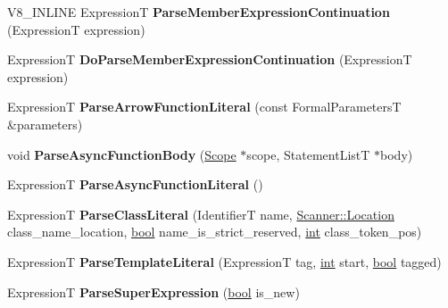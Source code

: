 \begin{DoxyCompactItemize}
V8\+\_\+\+I\+N\+L\+I\+NE ExpressionT {\bfseries Parse\+Member\+Expression\+Continuation} (ExpressionT expression)
\item 
\mbox{\label{classv8_1_1internal_1_1ParserBase_a7402d906ca1867d579e70a94f99299a5}} 
ExpressionT {\bfseries Do\+Parse\+Member\+Expression\+Continuation} (ExpressionT expression)
\item 
\mbox{\label{classv8_1_1internal_1_1ParserBase_a755e383beaba411dfd8f5513cc43761e}} 
ExpressionT {\bfseries Parse\+Arrow\+Function\+Literal} (const Formal\+ParametersT \&parameters)
\item 
\mbox{\label{classv8_1_1internal_1_1ParserBase_a130224aa6854e3d24e74eab11d362dc6}} 
void {\bfseries Parse\+Async\+Function\+Body} (\mbox{\hyperlink{classv8_1_1internal_1_1Scope}{Scope}} $\ast$scope, Statement\+ListT $\ast$body)
\item 
\mbox{\label{classv8_1_1internal_1_1ParserBase_a4a756ff888160f3521fa46a8709a1344}} 
ExpressionT {\bfseries Parse\+Async\+Function\+Literal} ()
\item 
\mbox{\label{classv8_1_1internal_1_1ParserBase_ab4206676bc19fa9f3658677ef5c5d739}} 
ExpressionT {\bfseries Parse\+Class\+Literal} (IdentifierT name, \mbox{\hyperlink{structv8_1_1internal_1_1Scanner_1_1Location}{Scanner\+::\+Location}} class\+\_\+name\+\_\+location, \mbox{\hyperlink{classbool}{bool}} name\+\_\+is\+\_\+strict\+\_\+reserved, \mbox{\hyperlink{classint}{int}} class\+\_\+token\+\_\+pos)
\item 
\mbox{\label{classv8_1_1internal_1_1ParserBase_a7dc6a447eeb0cde1b0591247bc207df1}} 
ExpressionT {\bfseries Parse\+Template\+Literal} (ExpressionT tag, \mbox{\hyperlink{classint}{int}} start, \mbox{\hyperlink{classbool}{bool}} tagged)
\item 
\mbox{\label{classv8_1_1internal_1_1ParserBase_a8cf528ceedefd06007d3d9ab77daa74c}} 
ExpressionT {\bfseries Parse\+Super\+Expression} (\mbox{\hyperlink{classbool}{bool}} is\+\_\+new)
\item 

\end{DoxyCompactItemize}

